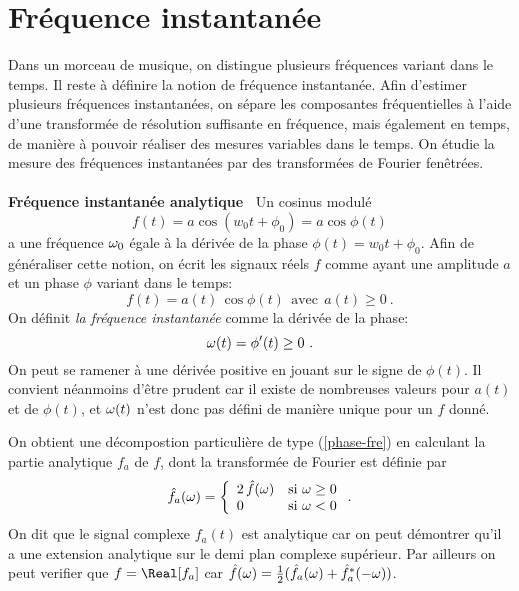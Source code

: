 \section{Fr\'{e}quence instantan\'{e}e}
\label{inst-fre-sec}

Dans un morceau de musique, on distingue plusieurs fr\'{e}quences 
variant dans le temps. Il reste \`{a} d\'{e}finire la notion de 
fr\'{e}quence instantan\'{e}e.  Afin d'estimer plusieurs 
fr\'{e}quences instantan\'{e}es, on s\'{e}pare les composantes 
fr\'{e}quentielles \`{a} l'aide d'une transform\'{e}e de 
r\'{e}solution suffisante en fr\'{e}quence, mais \'{e}galement en 
temps, de mani\`{e}re \`{a} pouvoir r\'{e}aliser des mesures variables 
dans le temps. On \'{e}tudie la mesure des fr\'{e}quences 
instantan\'{e}es par des transform\'{e}es de Fourier 
fen\^{e}tr\'{e}es.
\\
\\
{\bf 
Fr\'{e}quence instantan\'{e}e analytique\ } 
Un cosinus modul\'{e}
\[
f(t) = a \cos (w_0 t + \phi_0 ) = a \cos \phi(t)
\]
a une fr\'{e}quence ${\omega}_0$ \'{e}gale \`{a} la d\'{e}riv\'{e}e de la 
phase $\phi(t) =	w_0	t +	\phi_0$. Afin de g\'{e}n\'{e}raliser cette 
notion, on \'{e}crit les signaux r\'{e}els $f$ comme ayant une 
amplitude $a$ et un phase $\phi$ variant dans le temps:
\begin{equation}
\label{phase-fre}
f(t) = a(t)\, \cos \phi(t) ~~\mbox{
avec}~~ a(t) \geq 0~.
\end{equation}
On d\'{e}finit {\it la fr\'{e}quence instantan\'{e}e} comme la 
d\'{e}riv\'{e}e de la phase:
\[
{\omega}(t) = \phi' (t) \geq 0 ~.
\]
On peut se ramener \`{a} une d\'{e}riv\'{e}e positive en jouant sur le 
signe de $\phi (t)$. Il convient n\'{e}anmoins d'\^{e}tre prudent car
il existe de nombreuses valeurs pour $a(t)$ et de  $\phi (t)$,
et ${\omega} (t)$ n'est donc pas d\'{e}fini de mani\`{e}re unique pour un 
$f$ donn\'{e}.

On obtient une 
d\'{e}compostion particuli\`{e}re de type (\ref{phase-fre}) 
en calculant la partie analytique $f_a $ de $f$, 
dont la transform\'{e}e de Fourier est d\'efinie par
\begin{equation}
\label{analyt-par-f}
\hat f_a ({\omega}) = \left\{
\begin{array}{ll}
2\, \hat f({\omega}) & \mbox{si ${\omega} \geq 0$}\\
0 & \mbox{si ${\omega} < 0$}
\end{array} 
\right. .
\end{equation}
On dit que le signal complexe $f_a (t)$ est analytique car
on peut d\'emontrer qu'il a une extension analytique sur
le demi plan complexe sup\'erieur.
Par ailleurs on peut verifier que
$f = \Real [f_a ]$ car
$\hat f ({\omega}) = \frac 1 2 (\hat f_a ({\omega}) + \hat f_a^* (-{\omega}))$.

